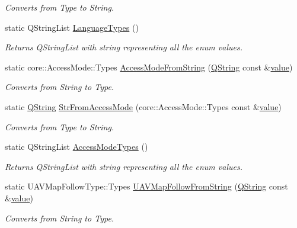 \begin{DoxyCompactItemize}
\begin{DoxyCompactList}\small\item\em Converts from Type to String. \end{DoxyCompactList}\item 
static Q\-String\-List \hyperlink{group___o_p_map_widget_ga28c4df400106ab046111295c18abfa28}{Language\-Types} ()
\begin{DoxyCompactList}\small\item\em Returns Q\-String\-List with string representing all the enum values. \end{DoxyCompactList}\item 
static core\-::\-Access\-Mode\-::\-Types \hyperlink{group___o_p_map_widget_ga800ba0d0ba832cda15296dcc2bad12c5}{Access\-Mode\-From\-String} (\hyperlink{group___u_a_v_objects_plugin_gab9d252f49c333c94a72f97ce3105a32d}{Q\-String} const \&\hyperlink{glext_8h_aa0e2e9cea7f208d28acda0480144beb0}{value})
\begin{DoxyCompactList}\small\item\em Converts from String to Type. \end{DoxyCompactList}\item 
static \hyperlink{group___u_a_v_objects_plugin_gab9d252f49c333c94a72f97ce3105a32d}{Q\-String} \hyperlink{group___o_p_map_widget_gaff17bf5b9d2437f75977d8456ee9e737}{Str\-From\-Access\-Mode} (core\-::\-Access\-Mode\-::\-Types const \&\hyperlink{glext_8h_aa0e2e9cea7f208d28acda0480144beb0}{value})
\begin{DoxyCompactList}\small\item\em Converts from Type to String. \end{DoxyCompactList}\item 
static Q\-String\-List \hyperlink{group___o_p_map_widget_gacc8738b3a3d1e4f7e0f4578685d495e0}{Access\-Mode\-Types} ()
\begin{DoxyCompactList}\small\item\em Returns Q\-String\-List with string representing all the enum values. \end{DoxyCompactList}\item 
static U\-A\-V\-Map\-Follow\-Type\-::\-Types \hyperlink{group___o_p_map_widget_ga7708397f9398bd6c207bd305ee711221}{U\-A\-V\-Map\-Follow\-From\-String} (\hyperlink{group___u_a_v_objects_plugin_gab9d252f49c333c94a72f97ce3105a32d}{Q\-String} const \&\hyperlink{glext_8h_aa0e2e9cea7f208d28acda0480144beb0}{value})
\begin{DoxyCompactList}\small\item\em Converts from String to Type. \end{DoxyCompactList}\item 

\end{DoxyCompactItemize}
